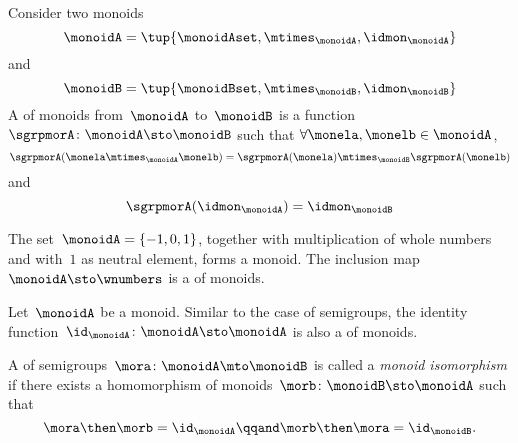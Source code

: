 \begin{ctdefinition}
  \label{def:monoid-mor}
  Consider two monoids
  \begin{equation}\label{eq:monoidA}
  \monoidA = \tup{\monoidAset, \mtimes_\monoidA, \idmon_\monoidA}
   \end{equation}
   and
   \begin{equation}\label{eq:monoidB}
   \monoidB = \tup{\monoidBset, \mtimes_\monoidB, \idmon_\monoidB}
   \end{equation}
  A \whomo of monoids from~$\monoidA$ to~$\monoidB$ is a function~$\sgrpmorA \colon \monoidA \sto \monoidB$ such that $ \forall \monela, \monelb \in \monoidA$,
  \begin{equation}
    \label{eq:mon-mor-comp}
    \sgrpmorA (\monela \mtimes_{\monoidA} \monelb) = \sgrpmorA (\monela) \mtimes_{\monoidB}  \sgrpmorA(\monelb)
  \end{equation}
  and
  \begin{equation}
    \label{eq:mon-id-comp}
    \sgrpmorA (\idmon_\monoidA) = \idmon_{\monoidB}
  \end{equation}
\end{ctdefinition}

\begin{example}
  The set~$\monoidA = \{ -1, 0, 1 \}$, together with multiplication of whole numbers and with~$1$ as neutral element, forms a monoid. The inclusion map~$\monoidA \sto \wnumbers$ is a \whomo of monoids.
\end{example}



\begin{definition}
  \label{def:identity-mon-mor}
  Let~$\monoidA$ be a monoid. Similar to the case of semigroups, the identity function~$\id_\monoidA\colon \monoidA \sto \monoidA$ is also a \whomo of monoids.
\end{definition}



\begin{definition}
  \label{def:monoid-iso}
  A \whomo of semigroups~$\mora\colon \monoidA \mto \monoidB$ is called a \emph{monoid isomorphism} if there exists a homomorphism of monoids~$\morb\colon \monoidB \sto \monoidA$ such that
  \begin{equation}
    \mora \then \morb = \id_\monoidA \qqand \morb \then \mora = \id_\monoidB.
  \end{equation}
\end{definition}


